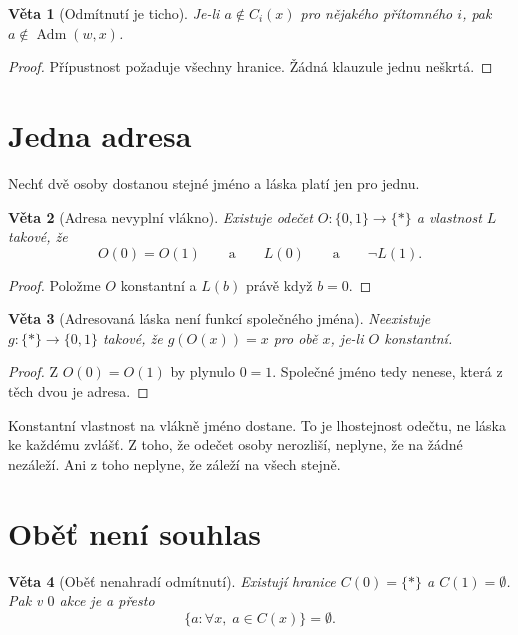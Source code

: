 \documentclass[11pt,a4paper]{article}
\newtheorem{theorem}{Věta}
\theoremstyle{definition}
\theoremstyle{remark}
\newcommand{\Adm}{\operatorname{Adm}}
\begin{document}
\begin{theorem}[Odmítnutí je ticho]
Je-li \(a\notin C_i(x)\) pro nějakého přítomného \(i\), pak \(a\notin\Adm(w,x)\).
\end{theorem}

\begin{proof}
Přípustnost požaduje všechny hranice. Žádná klauzule jednu neškrtá.
\end{proof}

\section{Jedna adresa}

Nechť dvě osoby dostanou stejné jméno a láska platí jen pro jednu.

\begin{theorem}[Adresa nevyplní vlákno]
Existuje odečet \(O\colon\{0,1\}\to\{\ast\}\) a vlastnost \(L\) takové, že
\[
  O(0)=O(1)
  \qquad\text{a}\qquad
  L(0)
  \qquad\text{a}\qquad
  \neg L(1).
\]
\end{theorem}

\begin{proof}
Položme \(O\) konstantní a \(L(b)\) právě když \(b=0\).
\end{proof}

\begin{theorem}[Adresovaná láska není funkcí společného jména]
Neexistuje \(g\colon\{\ast\}\to\{0,1\}\) takové, že \(g(O(x))=x\) pro obě \(x\),
je-li \(O\) konstantní.
\end{theorem}

\begin{proof}
Z \(O(0)=O(1)\) by plynulo \(0=1\).
Společné jméno tedy nenese, která z těch dvou je adresa.
\end{proof}

Konstantní vlastnost na vlákně jméno dostane.
To je lhostejnost odečtu, ne láska ke každému zvlášť.
Z toho, že odečet osoby nerozliší, neplyne, že na žádné nezáleží.
Ani z toho neplyne, že záleží na všech stejně.

\section{Oběť není souhlas}

\begin{theorem}[Oběť nenahradí odmítnutí]
Existují hranice \(C(0)=\{\ast\}\) a \(C(1)=\emptyset\).
Pak v \(0\) akce je a přesto
\[
  \{a : \forall x,\; a\in C(x)\}=\emptyset.
\]
\end{theorem}
\end{document}

